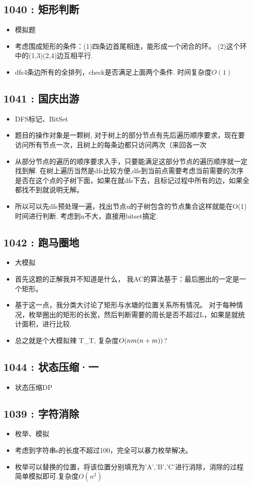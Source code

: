 \documentclass{article}
\begin{document}
\subsection{1040 : 矩形判断}
\begin{itemize}
\item 模拟题
\item 考虑围成矩形的条件：(1)四条边首尾相连，能形成一个闭合的环。 (2)这个环中的(1,3)(2,4)边互相平行.
\item dfs4条边所有的全排列，check是否满足上面两个条件. 时间复杂度$O(1)$
\end{itemize}


\subsection{1041 : 国庆出游}
\begin{itemize}
\item DFS标记、BitSet
\item 题目的操作对象是一颗树, 对于树上的部分节点有先后遍历顺序要求，现在要访问所有节点一次，且树上的每条边都只访问两次（来回各一次
\item 从部分节点的遍历的顺序要求入手，只要能满足这部分节点的遍历顺序就一定找到解. 在树上遍历当然是dfs比较方便,dfs到当前点需要考虑当前需要的次序是否在这个点的子树下面，如果在就dfs下去，且标记过程中所有的边，如果全都找不到就说明无解。
\item 所以可以先dfs预处理一遍，找出节点u的子树包含的节点集合这样就能在O(1)时间进行判断. 考虑到n不大，直接用bitset搞定.
\end{itemize}


\subsection{1042 : 跑马圈地}
\begin{itemize}
\item 大模拟
\item 首先这题的正解我并不知道是什么， 我AC的算法基于：最后圈出的一定是一个矩形。
\item 基于这一点，我分类大讨论了矩形与水塘的位置关系所有情况。 对于每种情况，枚举圈出的矩形的长宽，然后判断需要的周长是否不超过L，如果是就统计面积，进行比较.
\item 总之就是个大模拟辣 T\_T, 复杂度$O(n\*m\*(n+m))$?
\end{itemize}


\subsection{1044 : 状态压缩·一}
\begin{itemize}
\item 状态压缩DP
\end{itemize}


\subsection{1039 : 字符消除}
\begin{itemize}
\item 枚举、模拟
\item 考虑到字符串s的长度不超过100，完全可以暴力枚举解决。
\item 枚举可以替换的位置，将该位置分别填充为'A','B','C'进行消除，消除的过程简单模拟即可.复杂度$O(n^2)$
\end{itemize}

\end{document}
